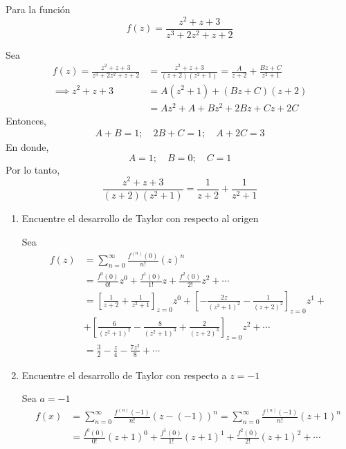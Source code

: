 \begin{problema}
    Para la función
    $$f(z)=\frac{z^2+z+3}{z^3+2 z^2+z+2}$$
    \begin{cajita}
        Sea
        \begin{align*}
            f(z)=\frac{z^2+z+3}{z^3+2 z^2+z+2} &= \frac{z^2+z+3}{(z+2)(z^2+1)} = \frac{A}{z+2}+\frac{Bz+C}{z^2+1}\\
            \implies z^2+z+3&= A(z^2+1)+(Bz+C)(z+2)\\
                   &= Az^2+A+Bz^2+2Bz +Cz+2C
        \end{align*}
        Entonces, 
        \begin{align*}
            A+B=1;\quad 2B+C =1; \quad A+2C=3
        \end{align*}
        En donde, 
        $$A=1;\quad B=0; \quad C=1$$
        Por lo tanto, 
        $$\frac{z^2+z+3}{(z+2)(z^2+1)} = \frac{1}{z+2}+\frac{1}{z^2+1}$$
    \end{cajita}
    \begin{enumerate}
        \item Encuentre el desarrollo de Taylor con respecto al origen
        \begin{sol}
            Sea
            \begin{align*}
                f(z) &= \sum_{n=0}^\infty \frac{f^{(n)}(0)}{n!}(z)^n\\
                &= \frac{f^{0}(0)}{0!}z^0+\frac{f^{1}(0)}{1!}z+\frac{f^{2}(0)}{2!}z^2+\cdots\\
                &=\left[\frac{1}{z+2}+\frac{1}{z^2+1}\right]_{z=0}z^0+\left[-\frac{2z}{(z^2+1)^2}-\frac{1}{(z+2)^2}\right]_{z=0}z^1+\\
                &+ \left[\frac{6}{(z^2+1)^2}-\frac{8}{(z^2+1)^3}+\frac{2}{(z+2)^3}\right]_{z=0}z^2+\cdots\\
                &=\frac{3}{2}-\frac{z}{4}-\frac{7z^2}{8}+\cdots
            \end{align*}
        \end{sol}
        \item Encuentre el desarrollo de Taylor con respecto a $z=-1$
        \begin{sol}
            Sea $a=-1$
            \begin{align*}
                f(x) &= \sum_{n=0}^\infty \frac{f^{(n)}(-1)}{n!}(z-(-1))^n = \sum_{n=0}^\infty \frac{f^{(n)}(-1)}{n!}(z+1)^n\\
                &= \frac{f^{0}(0)}{0!}(z+1)^0+\frac{f^{1}(0)}{1!}(z+1)^1+\frac{f^{2}(0)}{2!}(z+1)^2+\cdots\\

\end{align*}
\end{sol}
\end{enumerate}
\end{problema}
